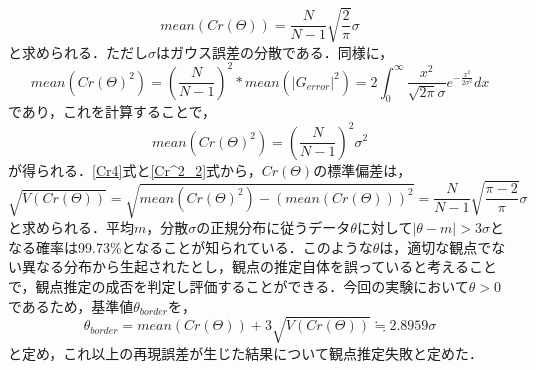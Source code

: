 	\begin{equation}
		\label{Cr4}
		mean(Cr(Θ)) = \frac{N}{N-1}\sqrt{\frac{2}{\pi}}σ
	\end{equation}
と求められる．ただし$σ$はガウス誤差の分散である．同様に，
	\begin{equation}
		\label{Cr^2_1}
		mean(Cr(Θ)^2) = \left(\frac{N}{N-1}\right)^2 * mean(|G_{error}|^2) 
		= 2\int_{0}^{\infty}\frac{x^2}{\sqrt{2\pi}σ}e^{-\frac{x^2}{2σ^2}}dx
	\end{equation}
であり，これを計算することで，
	\begin{equation}
		\label{Cr^2_2}
		mean(Cr(Θ)^2) = \left(\frac{N}{N-1}\right)^2 σ^2
	\end{equation}
が得られる．\ref{Cr4}式と\ref{Cr^2_2}式から，$Cr(Θ)$の標準偏差は，
	\begin{equation}
		\sqrt{V(Cr(Θ))} = \sqrt{mean(Cr(Θ)^2) - \left(mean(Cr(Θ))\right)^2} = \frac{N}{N-1}\sqrt{\frac{\pi-2}{\pi}}σ
	\end{equation}
と求められる．平均$m$，分散$σ$の正規分布に従うデータ$θ$に対して$|θ-m|>3σ$となる確率は99.73\%となることが知られている．このような$θ$は，適切な観点でない異なる分布から生起されたとし，観点の推定自体を誤っていると考えることで，観点推定の成否を判定し評価することができる．今回の実験において$θ>0$であるため，基準値$θ_{border}$を，
	\begin{equation}
		θ_{border} = mean(Cr(Θ))+3\sqrt{V(Cr(Θ))}≒2.8959σ
	\end{equation}
と定め，これ以上の再現誤差が生じた結果について観点推定失敗と定めた．



